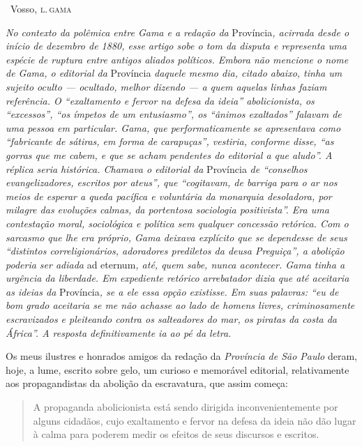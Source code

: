 {\medskip

\hfill\ Vosso, \textsc{l.\,gama}


\begin{resumo}
\emph{No contexto da polêmica entre Gama e a redação da}
Província\emph{, acirrada desde o início de dezembro de 1880, esse
artigo sobe o tom da disputa e representa uma espécie de ruptura entre
antigos aliados políticos. Embora não mencione o nome de Gama, o
editorial da} Província \emph{daquele mesmo dia, citado abaixo, tinha um
sujeito oculto --- ocultado, melhor dizendo --- a quem aquelas linhas
faziam referência. O ``exaltamento e fervor na defesa da ideia''
abolicionista, os ``excessos'', ``os ímpetos de um entusiasmo'', os ``ânimos
exaltados'' falavam de uma pessoa em particular. Gama, que
performaticamente se apresentava como ``fabricante de sátiras, em forma
de carapuças'', vestiria, conforme disse, ``as gorras que me cabem, e que
se acham pendentes do editorial a que aludo''. A réplica seria histórica.
Chamava o editorial da} Província \emph{de ``conselhos evangelizadores,
escritos por ateus'', que ``cogitavam, de barriga para o ar nos meios de
esperar a queda pacífica e voluntária da monarquia desoladora, por
milagre das evoluções calmas, da portentosa sociologia positivista''. Era
uma contestação moral, sociológica e política sem qualquer concessão
retórica. Com o sarcasmo que lhe era próprio, Gama deixava explícito que
se dependesse de seus ``distintos correligionários, adoradores prediletos
da deusa Preguiça'', a abolição poderia ser adiada} ad eternum\emph{,
até, quem sabe, nunca acontecer. Gama tinha a urgência da liberdade. Em
expediente retórico arrebatador dizia que até aceitaria as ideias da}
Província\emph{, se a ele essa opção existisse. Em suas palavras: ``eu de
bom grado aceitaria se me não achasse ao lado de homens livres,
criminosamente escravizados e pleiteando contra os salteadores do mar,
os piratas da costa da África''. A resposta definitivamente ia ao pé da
letra. }
\end{resumo}

Os meus ilustres e honrados amigos da redação da \emph{Província de São
Paulo} deram, hoje, a lume, escrito sobre gelo, um curioso e memorável
editorial, relativamente aos propagandistas da abolição da escravatura,
que assim começa:

\begin{quote}
A propaganda abolicionista está sendo dirigida inconvenientemente por
alguns cidadãos, cujo exaltamento e fervor na defesa da ideia não dão
lugar à calma para poderem medir os efeitos de seus discursos e
escritos.


\end{quote}}
